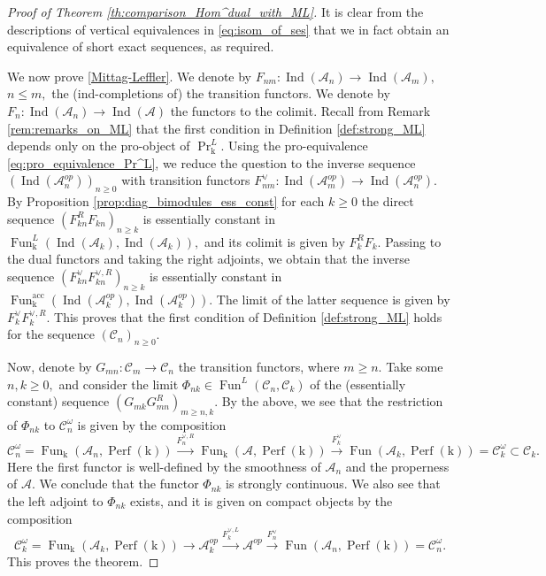 \documentclass[11pt,leqno]{amsart}
\numberwithin{equation}{section}
\newcommand{\xto}{\xrightarrow}
\newcommand{\acc}{\operatorname{acc}}
\newcommand{\mk}{\mathrm k}
\newcommand{\cA}{{\mathcal A}}
\newcommand{\cC}{{\mathcal C}}
\newcommand{\Fun}{\operatorname{Fun}}
\newcommand{\Perf}{\operatorname{Perf}}
\newcommand{\Ind}{\operatorname{Ind}}
\begin{document}
\begin{proof}[Proof of Theorem \ref{th:comparison_Hom^dual_with_ML}]
It is clear from the descriptions of vertical equivalences in \eqref{eq:isom_of_ses} that we in fact obtain an equivalence of short exact sequences, as required.

We now prove \ref{Mittag-Leffler}. We denote by $F_{nm}:\Ind(\cA_n)\to\Ind(\cA_m),$ $n\leq m,$ the (ind-completions of) the transition functors. We denote by $F_n:\Ind(\cA_n)\to\Ind(\cA)$ the functors to the colimit. Recall from Remark \ref{rem:remarks_on_ML} that the first condition in Definition \ref{def:strong_ML} depends only on the pro-object of $\Pr^{L}_{\mk}.$ Using the pro-equivalence \eqref{eq:pro_equivalence_Pr^L}, we reduce the question to the inverse sequence $(\Ind(\cA_n^{op}))_{n\geq 0}$ with transition functors $F_{nm}^{\vee}:\Ind(\cA_m^{op})\to\Ind(\cA_n^{op}).$ By Proposition \ref{prop:diag_bimodules_ess_const} for each $k\geq 0$ the direct sequence
$(F_{kn}^{R}F_{kn})_{n\geq k}$ is essentially constant in $\Fun_{\mk}^L(\Ind(\cA_k),\Ind(\cA_k)),$ and its colimit is given by $F_k^R F_k.$  Passing to the dual functors and taking the right adjoints, we obtain that the inverse sequence $(F_{kn}^{\vee}F_{kn}^{\vee,R})_{n\geq k}$ is essentially constant in $\Fun^{\acc}_{\mk}(\Ind(\cA_k^{op}),\Ind(\cA_k^{op})).$ The limit of the latter sequence is given by $F_k^{\vee}F_k^{\vee,R}.$ This proves that the first condition of Definition \ref{def:strong_ML} holds for the sequence $(\cC_n)_{n\geq 0}.$

Now, denote by $G_{mn}:\cC_m\to\cC_n$ the transition functors, where $m\geq n.$ Take some $n,k\geq 0,$ and consider the limit $\Phi_{nk}\in\Fun^L(\cC_n,\cC_k)$ of the (essentially constant) sequence $(G_{mk}G_{mn}^R)_{m\geq n,k}.$ By the above, we see that the restriction of $\Phi_{nk}$ to $\cC_n^{\omega}$ is given by the composition
\begin{equation*}
\cC_n^{\omega}=\Fun_{\mk}(\cA_n,\Perf(\mk))\xto{F_n^{\vee,R}}\Fun_{\mk}(\cA,\Perf(\mk))\xto{F_k^{\vee}}\Fun(\cA_k,\Perf(\mk))=\cC_k^{\omega}\subset\cC_k. 
\end{equation*}
Here the first functor is well-defined by the smoothness of $\cA_n$ and the properness of $\cA.$ We conclude that the functor $\Phi_{nk}$ is strongly continuous. We also see that the left adjoint to $\Phi_{nk}$ exists, and it is given on compact objects by the composition
\begin{equation*}
\cC_k^{\omega}=\Fun_{\mk}(\cA_k,\Perf(\mk))\to \cA_k^{op}\xto{F_k^{\vee,L}}\cA^{op}\xto{F_n^{\vee}}\Fun(\cA_n,\Perf(\mk))=\cC_n^{\omega}.
\end{equation*}
This proves the theorem.
\end{proof}
\end{document}
